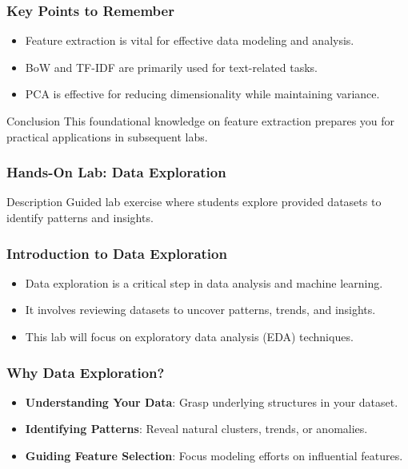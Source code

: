 \documentclass[aspectratio=169]{beamer}
\begin{document}
\begin{frame}[fragile]
    \frametitle{Key Points to Remember}
    \begin{itemize}
        \item Feature extraction is vital for effective data modeling and analysis.
        \item BoW and TF-IDF are primarily used for text-related tasks.
        \item PCA is effective for reducing dimensionality while maintaining variance.
    \end{itemize}
    \begin{block}{Conclusion}
        This foundational knowledge on feature extraction prepares you for practical applications in subsequent labs.
    \end{block}
\end{frame}

\begin{frame}
    \frametitle{Hands-On Lab: Data Exploration}
    \begin{block}{Description}
        Guided lab exercise where students explore provided datasets to identify patterns and insights.
    \end{block}
\end{frame}

\begin{frame}
    \frametitle{Introduction to Data Exploration}
    \begin{itemize}
        \item Data exploration is a critical step in data analysis and machine learning.
        \item It involves reviewing datasets to uncover patterns, trends, and insights.
        \item This lab will focus on exploratory data analysis (EDA) techniques.
    \end{itemize}
\end{frame}

\begin{frame}
    \frametitle{Why Data Exploration?}
    \begin{itemize}
        \item \textbf{Understanding Your Data}: Grasp underlying structures in your dataset.
        \item \textbf{Identifying Patterns}: Reveal natural clusters, trends, or anomalies.
        \item \textbf{Guiding Feature Selection}: Focus modeling efforts on influential features.
    \end{itemize}
\end{frame}
\end{document}
